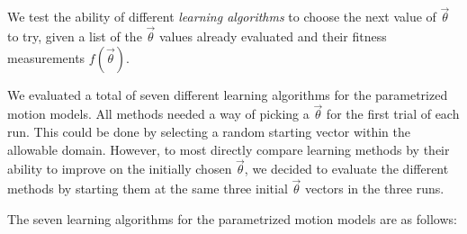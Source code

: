 We test the ability of different \emph{learning algorithms} to choose the next value of $\vec{\theta}$ to try, given a list of the
$\vec{\theta}$ values already evaluated and their fitness measurements $f(\vec{\theta})$.

We evaluated a total of seven different
learning algorithms for the parametrized motion models.  All methods
needed a way of picking a $\vec{\theta}$ for the first trial of each run.  This could be done by selecting a random starting vector within the
allowable domain.  However, to most directly compare learning methods
by their ability to improve on the initially chosen $\vec{\theta}$, we
decided to evaluate the different methods by starting them at the same three
initial $\vec{\theta}$ vectors in the three runs. 


The seven learning algorithms for the parametrized motion models are as follows:







